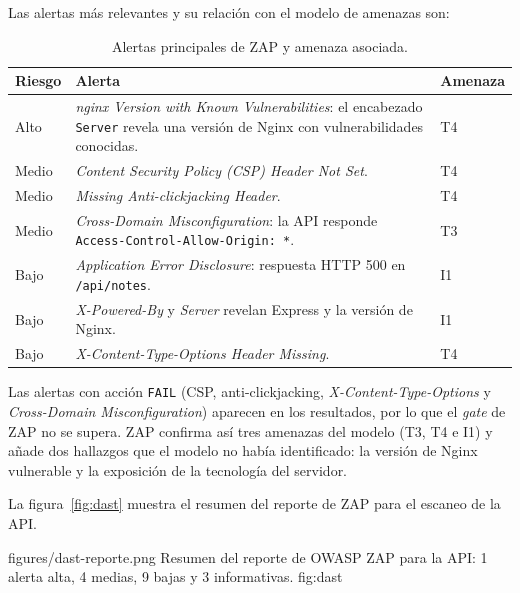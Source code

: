 Las alertas más relevantes y su relación con el modelo de amenazas son:

\begin{table}[H]
\centering
\caption{Alertas principales de ZAP y amenaza asociada.}
\label{tab:zap-alertas}

\begin{tabularx}{\textwidth}{l X l}
\toprule
\textbf{Riesgo} &
\textbf{Alerta} &
\textbf{Amenaza} \\
\midrule
Alto & \textit{nginx Version with Known Vulnerabilities}: el encabezado
\texttt{Server} revela una versión de Nginx con vulnerabilidades conocidas. &
T4 \\

Medio & \textit{Content Security Policy (CSP) Header Not Set}. & T4 \\

Medio & \textit{Missing Anti-clickjacking Header}. & T4 \\

Medio & \textit{Cross-Domain Misconfiguration}: la API responde
\texttt{Access-Control-Allow-Origin: *}. & T3 \\

Bajo & \textit{Application Error Disclosure}: respuesta HTTP 500 en
\texttt{/api/notes}. & I1 \\

Bajo & \textit{X-Powered-By} y \textit{Server} revelan Express y la versión de
Nginx. & I1 \\

Bajo & \textit{X-Content-Type-Options Header Missing}. & T4 \\
\bottomrule
\end{tabularx}
\end{table}

Las alertas con acción \texttt{FAIL} (CSP, anti-clickjacking,
\textit{X-Content-Type-Options} y \textit{Cross-Domain Misconfiguration})
aparecen en los resultados, por lo que el \textit{gate} de ZAP no se
supera. ZAP confirma así tres amenazas del modelo (T3, T4 e I1) y añade dos
hallazgos que el modelo no había identificado: la versión de Nginx vulnerable
y la exposición de la tecnología del servidor.

La figura~\ref{fig:dast} muestra el resumen del reporte de ZAP para el
escaneo de la API.

\evidencefigure
{figures/dast-reporte.png}
{Resumen del reporte de OWASP ZAP para la API: 1 alerta alta, 4 medias, 9 bajas y 3 informativas.}
{fig:dast}


